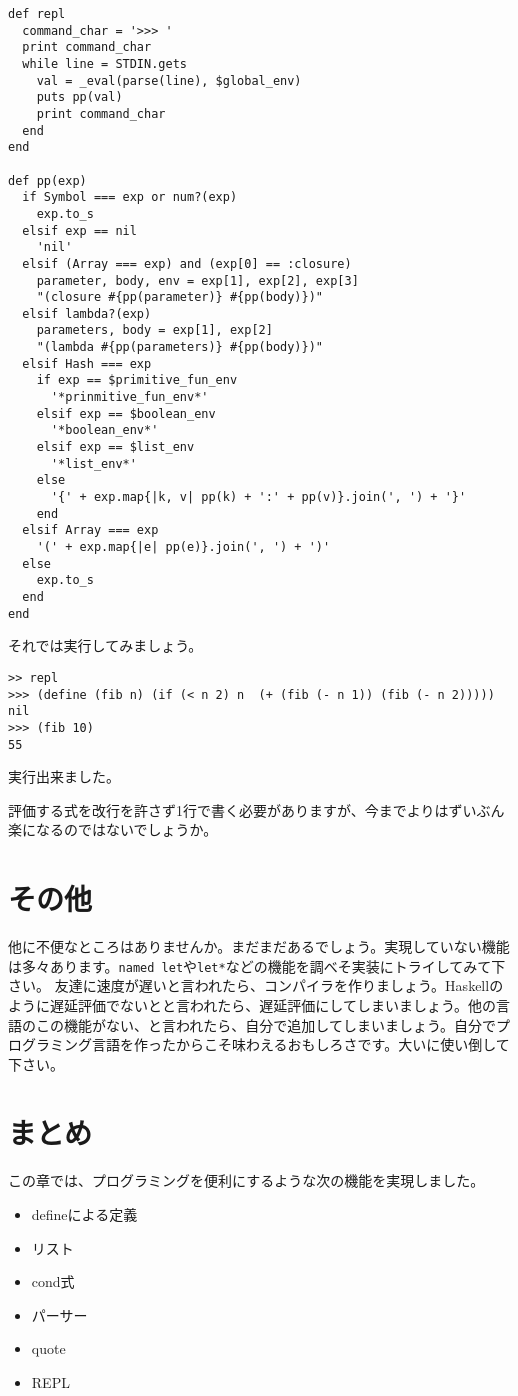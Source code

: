 \begin{lstlisting}
def repl
  command_char = '>>> '
  print command_char
  while line = STDIN.gets
    val = _eval(parse(line), $global_env)
    puts pp(val)
    print command_char
  end
end

def pp(exp)
  if Symbol === exp or num?(exp)
    exp.to_s
  elsif exp == nil
    'nil'
  elsif (Array === exp) and (exp[0] == :closure)
    parameter, body, env = exp[1], exp[2], exp[3]
    "(closure #{pp(parameter)} #{pp(body)})"
  elsif lambda?(exp)
    parameters, body = exp[1], exp[2]
    "(lambda #{pp(parameters)} #{pp(body)})"
  elsif Hash === exp
    if exp == $primitive_fun_env
      '*prinmitive_fun_env*'
    elsif exp == $boolean_env
      '*boolean_env*'
    elsif exp == $list_env
      '*list_env*'
    else
      '{' + exp.map{|k, v| pp(k) + ':' + pp(v)}.join(', ') + '}'
    end
  elsif Array === exp
    '(' + exp.map{|e| pp(e)}.join(', ') + ')'
  else 
    exp.to_s
  end
end
\end{lstlisting}

それでは実行してみましょう。

\begin{lstlisting}
>> repl
>>> (define (fib n) (if (< n 2) n  (+ (fib (- n 1)) (fib (- n 2)))))
nil
>>> (fib 10)     
55
\end{lstlisting}

実行出来ました。

評価する式を改行を許さず1行で書く必要がありますが、今までよりはずいぶん楽になるのではないでしょうか。

\section{その他}
他に不便なところはありませんか。まだまだあるでしょう。実現していない機能は多々あります。{\tt named let}や{\tt let*}などの機能を調べそ実装にトライしてみて下さい。
友達に速度が遅いと言われたら、コンパイラを作りましょう。Haskellのように遅延評価でないとと言われたら、遅延評価にしてしまいましょう。他の言語のこの機能がない、と言われたら、自分で追加してしまいましょう。自分でプログラミング言語を作ったからこそ味わえるおもしろさです。大いに使い倒して下さい。


\section{まとめ}
この章では、プログラミングを便利にするような次の機能を実現しました。
\begin{itemize}
\item defineによる定義
\item リスト
\item cond式
\item パーサー
\item quote
\item REPL
\end{itemize}


